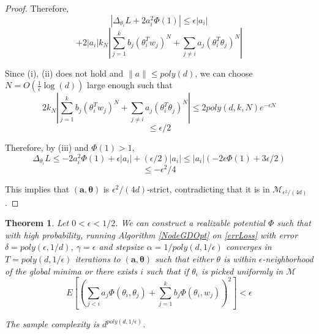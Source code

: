 \documentclass{article}
\newtheorem{theorem}{Theorem}[section]
\begin{document}
\begin{proof}
Therefore,
%
\[|\Delta_{\theta_i}L + 2a_i^2\Phi(1)| \leq \epsilon |a_i| \]
\[+  2|a_i| k_N|\sum_{j=1}^k b_j (\theta_i^Tw_j)^N +  \sum_{j\neq i}  a_j(\theta_i^T\theta_j)^N|\]

Since (i), (ii) does not hold and $\|a\| \leq poly(d)$, we can choose $N = O(\frac{1}{\epsilon}\log(d))$ large enough such that 
%
\[ 2k_N |\sum_{j=1}^k b_j (\theta_i^Tw_j)^N +  \sum_{j\neq i}  a_j(\theta_i^T\theta_j)^N| \leq  2poly(d,k,N)e^{-\epsilon N} \]
\[\leq \epsilon/2\] 

Therefore, by (iii) and $\Phi(1) > 1$,
%
\[\Delta_{\theta_i} L \leq -2a_i^2 \Phi(1) +\epsilon |a_i|+(\epsilon/2)|a_i| \leq |a_i|(-2\epsilon \Phi(1) + 3\epsilon/2) \]
\[\leq -\epsilon^2/4\]

This implies that $(\boldsymbol{a,\theta})$ is $\epsilon^2/(4d)$-strict, contradicting that it is in $\mathcal{M}_{\epsilon^2/(4d)}$. 
\end{proof}


\begin{theorem}
Let  $0 < \epsilon < 1/2$. We can construct a realizable potential $\Phi$ such that with high probability, running Algorithm \ref{NodeGDOpt} on \eqref{errLoss} with error $\delta = poly(\epsilon,1/d)$, $\gamma = \epsilon$ and stepsize $\alpha = 1/poly(d,1/\epsilon)$ converges in $T = poly(d, 1/\epsilon)$ iterations to $(\boldsymbol{a,\theta})$ such that either  $\theta$ is within $\epsilon$-neighborhood of the global minima or there exists $i$ such that if $\theta_i$ is picked uniformly in $\mathcal{M}$
%
\[ E\left[\left( \sum_{j < i} a_j \Phi(\theta_i,\theta_j) + \sum_{j=1}^k b_j \Phi(\theta_i,w_j)\right)^2\right] < \epsilon\]

The sample complexity is $d^{poly(d,1/\epsilon)}$.
\end{theorem}
\end{document}
